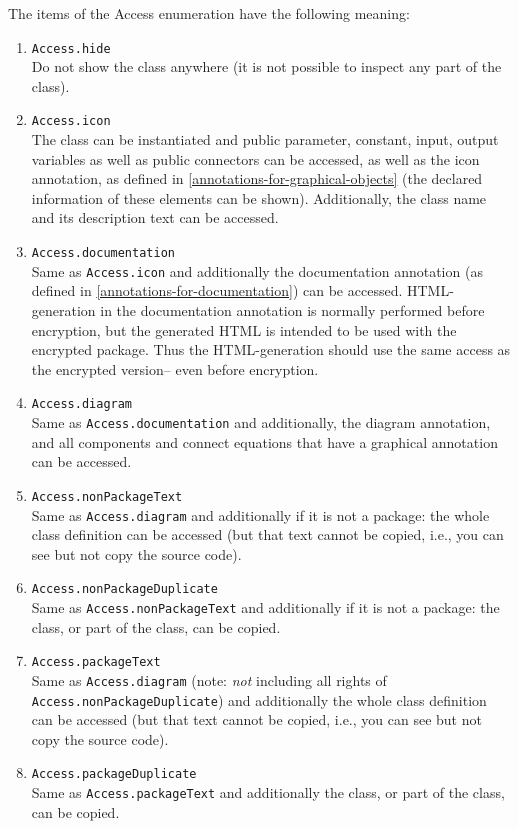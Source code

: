 The items of the Access enumeration have the following meaning:
\begin{enumerate}
\item
  \lstinline!Access.hide!\\
  Do not show the class anywhere (it is not possible to inspect any part
  of the class).
\item
  \lstinline!Access.icon!\\
  The class can be instantiated and public parameter, constant, input,
  output variables as well as public connectors can be accessed, as well
  as the icon annotation, as defined in \cref{annotations-for-graphical-objects} (the declared
  information of these elements can be shown). Additionally, the class
  name and its description text can be accessed.
\item
  \lstinline!Access.documentation!\\
  Same as \lstinline!Access.icon! and additionally the documentation annotation (as
  defined in \cref{annotations-for-documentation}) can be accessed. HTML-generation in the
  documentation annotation is normally performed before encryption, but
  the generated HTML is intended to be used with the encrypted package.
  Thus the HTML-generation should use the same access as the encrypted
  version-- even before encryption.
\item
  \lstinline!Access.diagram!\\
  Same as \lstinline!Access.documentation! and additionally, the diagram annotation,
  and all components and connect equations that have a graphical
  annotation can be accessed.
\item
  \lstinline!Access.nonPackageText!\\
  Same as \lstinline!Access.diagram! and additionally if it is not a package: the
  whole class definition can be accessed (but that text cannot be copied, i.e., you can see but not copy the source code).
\item
  \lstinline!Access.nonPackageDuplicate!\\
  Same as \lstinline!Access.nonPackageText! and additionally if it is not a package:
  the class, or part of the class, can be copied.
\item
  \lstinline!Access.packageText!\\
  Same as \lstinline!Access.diagram! (note: \emph{not} including all rights of
  \lstinline!Access.nonPackageDuplicate!) and additionally the whole class
  definition can be accessed (but that text cannot be copied, i.e., you can see but not copy the source code).
\item
  \lstinline!Access.packageDuplicate!\\
  Same as \lstinline!Access.packageText! and additionally the class, or part of the
  class, can be copied.
\end{enumerate}

